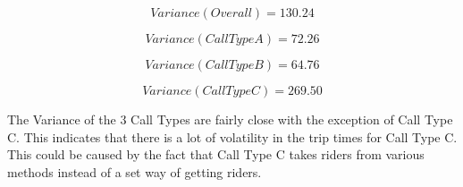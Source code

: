 \documentclass[11pt]{article}
\begin{document}
\begin{equation}
Variance (Overall) = 130.24
\end{equation}

\begin{equation}
Variance (Call Type A) = 72.26
\end{equation}

\begin{equation}
Variance (Call Type B) = 64.76
\end{equation}

\begin{equation}
Variance (Call Type C) = 269.50
\end{equation}

\par
The Variance of the 3 Call Types are fairly close with the exception of Call Type C. This indicates that there is a lot of volatility in the trip times for Call Type C. This could be caused by the fact that Call Type C takes riders from various methods instead of a set way of getting riders.
\end{document}
